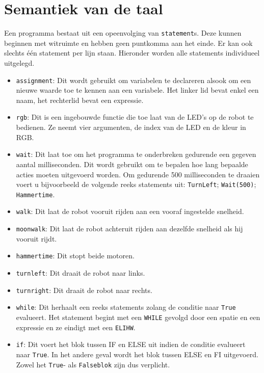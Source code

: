 \documentclass[a4paper]{article}
\begin{document}
\section{Semantiek van de taal}
Een programma bestaat uit een opeenvolging van \verb|statement|s. Deze kunnen beginnen met witruimte en hebben geen puntkomma aan het einde. Er kan ook slechts \'e\'en statement per lijn staan.
Hieronder worden alle statements individueel uitgelegd.
\begin{itemize}
\item \verb|assignment|: Dit wordt gebruikt om variabelen te declareren alsook om een nieuwe waarde toe te kennen aan een variabele. Het linker lid bevat enkel een naam, het rechterlid bevat een expressie.
\item \verb|rgb|: Dit is een ingebouwde functie die toe laat van de LED's op de robot te bedienen. Ze neemt vier argumenten, de index van de LED en de kleur in RGB.
\item \verb|wait|: Dit laat toe om het programma te onderbreken gedurende een gegeven aantal milliseconden. Dit wordt gebruikt om te bepalen hoe lang bepaalde acties moeten uitgevoerd worden. Om gedurende 500 milliseconden te draaien voert u bijvoorbeeld de volgende reeks statements uit: \verb|TurnLeft|; \verb|Wait(500)|; \verb|Hammertime|.
\item \verb|walk|: Dit laat de robot vooruit rijden aan een vooraf ingestelde snelheid.
\item \verb|moonwalk|: Dit laat de robot achteruit rijden aan dezelfde snelheid als hij vooruit rijdt.
\item \verb|hammertime|: Dit stopt beide motoren.
\item \verb|turnleft|: Dit draait de robot naar links.
\item \verb|turnright|: Dit draait de robot naar rechts.
\item \verb|while|: Dit herhaalt een reeks statements zolang de conditie naar \verb|True| evalueert. Het statement begint met een \verb|WHILE| gevolgd door een spatie en een expressie en ze eindigt met een \verb|ELIHW|.
\item \verb|if|: Dit voert het blok tussen IF en ELSE uit indien de conditie evalueert naar \verb|True|. In het andere geval wordt het blok tussen ELSE en FI uitgevoerd. Zowel het \verb|True|- als \verb|Falseblok| zijn dus verplicht.
\end{itemize}
\end{document}
